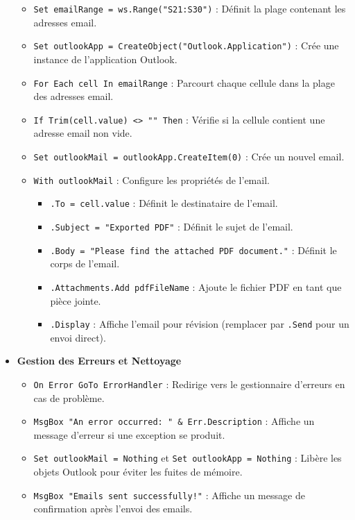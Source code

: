 \documentclass[a4paper, oneside, 12pt, final]{extreport}
\begin{document}
\begin{itemize}
\begin{itemize}
    \item \texttt{Set emailRange = ws.Range("S21:S30")} : Définit la plage contenant les adresses email.
    \item \texttt{Set outlookApp = CreateObject("Outlook.Application")} : Crée une instance de l'application Outlook.
    \item \texttt{For Each cell In emailRange} : Parcourt chaque cellule dans la plage des adresses email.
    \item \texttt{If Trim(cell.value) <> "" Then} : Vérifie si la cellule contient une adresse email non vide.
    \item \texttt{Set outlookMail = outlookApp.CreateItem(0)} : Crée un nouvel email.
    \item \texttt{With outlookMail} : Configure les propriétés de l'email.
    \begin{itemize}
        \item \texttt{.To = cell.value} : Définit le destinataire de l'email.
        \item \texttt{.Subject = "Exported PDF"} : Définit le sujet de l'email.
        \item \texttt{.Body = "Please find the attached PDF document."} : Définit le corps de l'email.
        \item \texttt{.Attachments.Add pdfFileName} : Ajoute le fichier PDF en tant que pièce jointe.
        \item \texttt{.Display} : Affiche l'email pour révision (remplacer par \texttt{.Send} pour un envoi direct).
    \end{itemize}
\end{itemize}

\item\textbf{Gestion des Erreurs et Nettoyage}

\begin{itemize}
    \item \texttt{On Error GoTo ErrorHandler} : Redirige vers le gestionnaire d'erreurs en cas de problème.
    \item \texttt{MsgBox "An error occurred: " \& Err.Description} : Affiche un message d'erreur si une exception se produit.
    \item \texttt{Set outlookMail = Nothing} et \texttt{Set outlookApp = Nothing} : Libère les objets Outlook pour éviter les fuites de mémoire.
    \item \texttt{MsgBox "Emails sent successfully!"} : Affiche un message de confirmation après l'envoi des emails.
\end{itemize}
\end{itemize}
\end{document}
